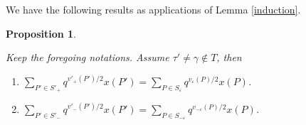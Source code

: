 \documentclass[10pt]{amsart}
\theoremstyle{theorems}
\newtheorem{Proposition}[Theorem]{Proposition}
\begin{document}
\medskip

We have the following results as applications of Lemma \ref{induction}.

\medskip

\begin{Proposition}\label{initial}

Keep the foregoing notations. Assume $\tau'\neq\gamma\notin T$, then

\begin{enumerate}[$(1)$]

  \item $\sum_{P'\in S'_{+}}q^{v'_{+}(P')/2}x(P')=\sum_{P\in S_{\varepsilon}}q^{v_{\varepsilon}(P)/2}x(P)$.

  \item $\sum_{P'\in S'_{-}}q^{v'_{-}(P')/2}x(P')=\sum_{P\in S_{-\varepsilon}}q^{v_{-\varepsilon}(P)/2}x(P)$.

\end{enumerate}

\end{Proposition}
\end{document}
